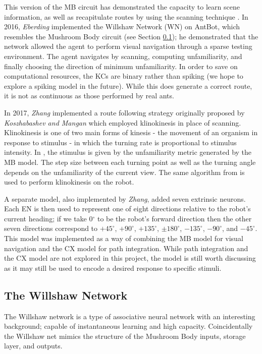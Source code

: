 \documentclass[a4paper,11pt,twoside,openright]{article}
\begin{document}
This version of the MB circuit has demonstrated the capacity to learn scene information, as well
as recapitulate routes by using the scanning technique \cite{Ardin2016}. In 2016, \textit{Eberding}
implemented the Willshaw Network (WN) on AntBot, which resembles the Mushroom Body circuit (see Section \ref{sec:wn}); he
demonstrated that the network allowed the agent to perform visual navigation through a sparse testing
environment\cite{Eberding2016}. The agent navigates by scanning, computing unfamiliarity, and finally
choosing the direction of minimum unfamiliarity. In order to save on computational resources, the
KCs are binary rather than spiking (we hope to explore a spiking model in the future). While this does
generate a correct route, it is not as continuous as those performed by real ants.
\newline

In 2017, \textit{Zhang} implemented a route following strategy originally proposed by
\textit{Koszhabashev and Mangan} which employed klinokinesis in place of scanning. Klinokinesis
is one of two main forms of kinesis - the movement of an organism in response to stimulus - in which
the turning rate is proportional to stimulus intensity. In \cite{Zhang2017}, the
stimulus is given by the unfamiliarity metric generated by the MB model. The step size between each
turning point as well as the turning angle depends on the unfamiliarity of the current view. The same
algorithm from \cite{Kodzhabashev2015} is used to perform klinokinesis on the robot.
\newline

A separate model, also implemented by \textit{Zhang}, added seven extrinsic neurons. Each EN is then
used to represent one of eight directions relative to the robot's current heading; if we take 0$^\circ$
to be the robot's forward direction then the other seven directions correspond to $+45^\circ$,
$+90^\circ$, $+135^\circ$, $\pm180^\circ$, $-135^\circ$, $-90^\circ$, and $-45^\circ$. This model was implemented as a way of
combining the MB model for visual navigation and the CX model for path integration. While path
integration and the CX model are not explored in this project, the model is still worth discussing
as it may still be used to encode a desired response to specific stimuli.


\subsection{The Willshaw Network} \label{sec:wn}
The Willshaw network is a type of associative neural network with an interesting background; capable of
instantaneous learning and high capacity. Coincidentally the Willshaw net mimics the structure of the Mushroom Body
inputs, storage layer, and outputs.
\newline
\end{document}
